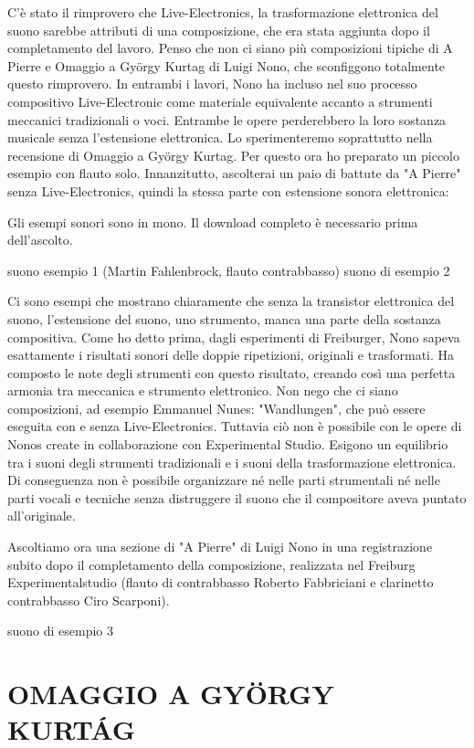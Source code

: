 C'è stato il rimprovero che Live-Electronics, la trasformazione elettronica del suono sarebbe attributi di una composizione, che era stata aggiunta dopo il completamento del lavoro. Penso che non ci siano più composizioni tipiche di A Pierre e Omaggio a György Kurtag di Luigi Nono, che sconfiggono totalmente questo rimprovero. In entrambi i lavori, Nono ha incluso nel suo processo compositivo Live-Electronic come materiale equivalente accanto a strumenti meccanici tradizionali o voci. Entrambe le opere perderebbero la loro sostanza musicale senza l'estensione elettronica. 
Lo sperimenteremo soprattutto nella recensione di Omaggio a György Kurtag. Per questo ora ho preparato un piccolo esempio con flauto solo. Innanzitutto, ascolterai un paio di battute da "A Pierre" senza Live-Electronics, quindi la stessa parte con estensione sonora elettronica: 

Gli esempi sonori sono in mono. Il download completo è necessario prima dell'ascolto. 

suono esempio 1 (Martin Fahlenbrock, flauto contrabbasso) 
suono di esempio 2 

Ci sono esempi che mostrano chiaramente che senza la transistor elettronica del suono, l'estensione del suono, uno strumento, manca una parte della sostanza compositiva. Come ho detto prima, dagli esperimenti di Freiburger, Nono sapeva esattamente i risultati sonori delle doppie ripetizioni, originali e trasformati. Ha composto le note degli strumenti con questo risultato, creando così una perfetta armonia tra meccanica e strumento elettronico. Non nego che ci siano composizioni, ad esempio Emmanuel Nunes: "Wandlungen", che può essere eseguita con e senza Live-Electronics. Tuttavia ciò non è possibile con le opere di Nonos create in collaborazione con Experimental Studio. Esigono un equilibrio tra i suoni degli strumenti tradizionali e i suoni della trasformazione elettronica. Di conseguenza non è possibile organizzare né nelle parti strumentali né nelle parti vocali e tecniche senza distruggere il suono che il compositore aveva puntato all'originale. 

Ascoltiamo ora una sezione di "A Pierre" di Luigi Nono in una registrazione subito dopo il completamento della composizione, realizzata nel Freiburg Experimentalstudio (flauto di contrabbasso Roberto Fabbriciani e clarinetto contrabbasso Ciro Scarponi). 

suono di esempio 3 

\section{OMAGGIO A GYÖRGY KURTÁG}

